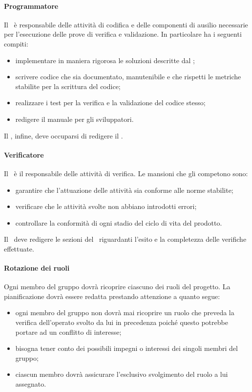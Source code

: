\documentclass[../NormeProgetto.tex]{subfiles}
\begin{document}
		\paragraph{Programmatore}
			Il \programmatore\ è responsabile delle attività di codifica e delle componenti di ausilio necessarie per l'esecuzione delle prove di verifica e validazione. In particolare ha i seguenti compiti:
			\begin{itemize}
				\item implementare in maniera rigorosa le soluzioni descritte dal \progettista;
				\item scrivere codice che sia documentato, manutenibile e che rispetti le metriche stabilite per la scrittura del codice;
				\item realizzare i test per la verifica e la validazione del codice stesso;
				\item redigere il manuale per gli sviluppatori.
			\end{itemize}
			Il \programmatore, infine, deve occuparsi di redigere il \manualeutente.
		\paragraph{Verificatore}
			Il \verificatore\ è il responsabile delle attività di verifica. Le mansioni che gli competono sono:
			\begin{itemize}
				\item garantire che l'attuazione delle attività sia conforme alle norme stabilite;
				\item verificare che le attività svolte non abbiano introdotti errori;
				\item controllare la conformità di ogni stadio del ciclo di vita del prodotto\g.
			\end{itemize}
			Il \verificatore\ deve redigere le sezioni del \pianodiqualifica\ riguardanti l'esito e la completezza delle verifiche effettuate.
		\paragraph{Rotazione dei ruoli}
			Ogni membro del gruppo dovrà ricoprire ciascuno dei ruoli del progetto. La pianificazione dovrà essere redatta prestando attenzione a quanto segue:
			\begin{itemize}
				\item ogni membro del gruppo non dovrà mai ricoprire un ruolo che preveda la verifica dell'operato svolto da lui in precedenza poiché questo potrebbe portare ad un conflitto di interesse;
				\item bisogna tener conto dei possibili impegni o interessi dei singoli membri del gruppo;
				\item ciascun membro dovrà assicurare l'esclusivo svolgimento del ruolo a lui assegnato.
			\end{itemize}				
\end{document}
